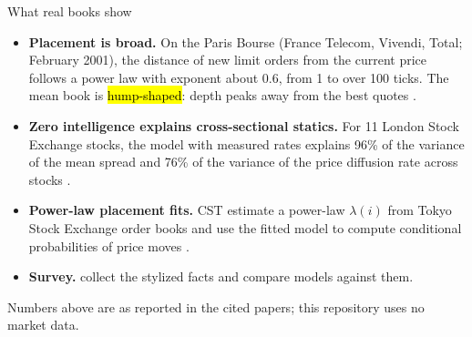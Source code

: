 \documentclass[aspectratio=169,10pt]{beamer}
\begin{document}
\begin{frame}{What real books show}
  \small
  \begin{itemize}
    \item \textbf{Placement is broad.} On the Paris Bourse (France Telecom, Vivendi, Total; February 2001), the distance of new limit orders from the current price follows a power law with exponent about $0.6$, from 1 to over 100 ticks. The mean book is \hl{hump-shaped}: depth peaks away from the best quotes \citep{bouchaud2002statistical}.
    \item \textbf{Zero intelligence explains cross-sectional statics.} For 11 London Stock Exchange stocks, the model with measured rates explains 96\% of the variance of the mean spread and 76\% of the variance of the price diffusion rate across stocks \citep{farmer2005predictive}.
    \item \textbf{Power-law placement fits.} CST estimate a power-law $\lambda(i)$ from Tokyo Stock Exchange order books and use the fitted model to compute conditional probabilities of price moves \citep{cont2010stochastic}.
    \item \textbf{Survey.} \citet{gould2013limit} collect the stylized facts and compare models against them.
  \end{itemize}
  \vspace{0.3em}
  \small Numbers above are as reported in the cited papers; this repository uses no market data.
\end{frame}
\end{document}
